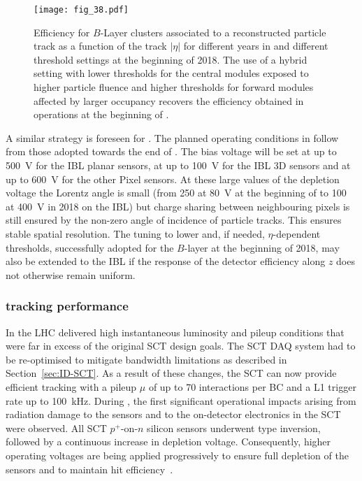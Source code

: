 \documentclass[cernpreprint, atlasdraft=false, UKenglish,british,orcidlogo, texmf, orcidlogo]{atlasdoc}
\begin{document}
\begin{figure}[ht!]
\begin{center}
\texttt{[image: fig\_38.pdf]}
\end{center}
\caption{Efficiency for $B$-Layer clusters associated to a reconstructed particle track as a function of the track $|\eta|$ for different years in \RunTwo and different threshold settings at the beginning of 2018. The use of a hybrid setting with lower thresholds for the central modules exposed to higher particle fluence and higher thresholds for forward modules affected by larger occupancy recovers the efficiency obtained in operations at the beginning of \RunTwo.
\label{fig:BLEff}}
\end{figure}
 
A similar strategy is foreseen for \RunThr.  The planned operating conditions in \RunThr follow from those adopted towards the end of \RunTwo. The bias voltage will be set at up to \SI{500}{\volt} for the \gls{IBL} planar sensors, at up to \SI{100}{\volt} for the \gls{IBL} 3D sensors and at up to \SI{600}{\volt} for the other Pixel sensors. At these large values of the depletion voltage the Lorentz angle is small (from \SI{250}{\mrad} at \SI{80}{\volt} at the beginning of \RunTwo to \SI{100}{\mrad} at \SI{400}{\volt} in 2018 on the \gls{IBL}) but charge sharing between neighbouring pixels is still ensured by the non-zero angle of incidence of particle tracks. This ensures stable spatial resolution. The tuning to lower and, if needed, $\eta$-dependent thresholds, successfully adopted for the $B$-layer at the beginning of 2018, may also be extended to the \gls{IBL} if the response of the detector efficiency along $z$ does not otherwise remain uniform.
 
\subsubsection{ tracking performance}
\label{sss:sctPerf}
In \RunTwo the \gls{LHC} delivered high instantaneous luminosity and pileup conditions that were far in excess of the original \gls{SCT} design goals. The \gls{SCT} \gls{DAQ} system had to be re-optimised to mitigate bandwidth limitations as described in Section~\ref{sec:ID-SCT}.
As a result of these changes, the \gls{SCT} can now provide efficient tracking with a pileup $\mu$ of up to 70 \pp interactions per \gls{BC} and a \gls{L1} trigger rate up to \SI{100}{\kHz}. 
During \RunTwo, the first significant operational impacts arising from radiation damage to the sensors and to the on-detector electronics in the \gls{SCT} were observed. All \gls{SCT} $p^+$-on-$n$ silicon sensors underwent type inversion, followed by a continuous
increase in depletion voltage. Consequently, higher operating voltages are being applied progressively to ensure full depletion of the sensors and to maintain hit efficiency~\cite{SCTD-2019-01}.
 
\end{document}
